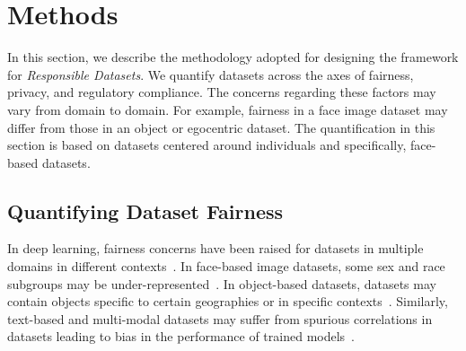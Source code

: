 \documentclass[journal]{IEEEtran}
\begin{document}


\section{Methods}
In this section, we describe the methodology adopted for designing the framework for \textit{Responsible Datasets}. We quantify datasets across the axes of fairness, privacy, and regulatory compliance. The concerns regarding these factors may vary from domain to domain. For example, fairness in a face image dataset may differ from those in an object or egocentric dataset. The quantification in this section is based on datasets centered around individuals and specifically, face-based datasets.

\subsection{Quantifying Dataset Fairness} In deep learning, fairness concerns have been raised for datasets in multiple domains in different contexts~\cite{cao2018vggface2,rojasdollar}. In face-based image datasets, some sex and race subgroups may be under-represented~\cite{cao2018vggface2,yi2014learning}. In object-based datasets, datasets may contain objects specific to certain geographies or in specific contexts~\cite{rojasdollar,deng2009imagenet}. Similarly, text-based and multi-modal datasets may suffer from spurious correlations in datasets leading to bias in the performance of trained models~\cite{geirhos2020shortcut}.
\end{document}
